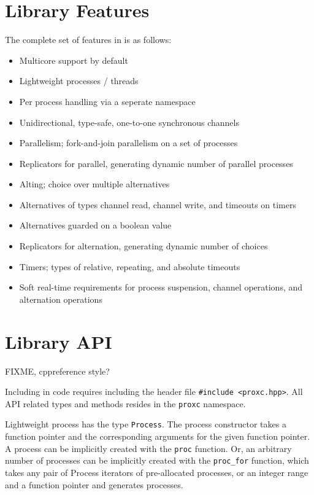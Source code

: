 \section{Library Features}
\label{sec:library_features}


The complete set of features in \Proxc{} is as follows:

\begin{itemize}[topsep=0em,itemsep=-1em,partopsep=0.5em,parsep=1em]
    \item Multicore support by default
    \item Lightweight processes / threads
    \item Per process handling via a seperate namespace
    \item Unidirectional, type\hyp{}safe, one\hyp{}to\hyp{}one synchronous channels
    \item Parallelism; fork\hyp{}and\hyp{}join parallelism on a set of processes
    \item Replicators for parallel, generating dynamic number of parallel processes
    \item Alting; choice over multiple alternatives
    \item Alternatives of types channel read, channel write, and timeouts on timers
    \item Alternatives guarded on a boolean value
    \item Replicators for alternation, generating dynamic number of choices
    \item Timers; types of relative, repeating, and absolute timeouts
    \item Soft real\hyp{}time requirements for process suspension, channel operations, and alternation operations
\end{itemize}


\section{Library API}
\label{sec:library_api}

FIXME, cppreference style?

Including \Proxc{} in code requires including the header file \lstinline[style={CustomC++}]|#include <proxc.hpp>|. All API related types and methods resides in the \lstinline[style={CustomC++}]|proxc| namespace. 

Lightweight process has the type \lstinline[style={CustomC++}]|Process|. The process constructor takes a function pointer and the corresponding arguments for the given function pointer. A process can be implicitly created with the \lstinline[style={CustomC++}]|proc| function. Or, an arbitrary number of processes can be implicitly created with the \lstinline[style={CustomC++}]|proc_for| function, which takes any pair of Process iterators of pre\hyp{}allocated processes, or an integer range and a function pointer and generates processes.

